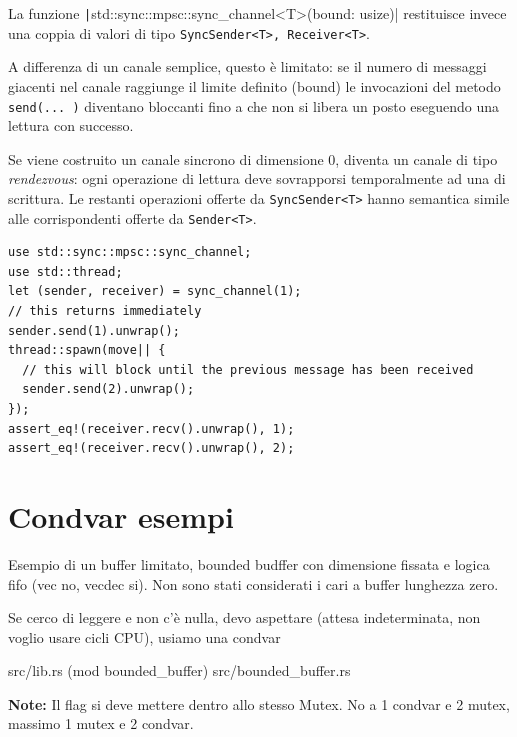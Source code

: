 La funzione \texttt|std::sync::mpsc::sync_channel<T>(bound: usize)|
restituisce invece una coppia di valori di tipo \verb|SyncSender<T>, Receiver<T>|.

A differenza di un canale semplice, questo è limitato: se il numero di messaggi
giacenti nel canale raggiunge il limite definito (bound) le invocazioni del
metodo \verb|send(... )| diventano bloccanti fino a che non si libera un posto
eseguendo una lettura con successo.

Se viene costruito un canale sincrono di dimensione 0, diventa un canale di tipo
\textit{rendezvous}: ogni operazione di lettura deve sovrapporsi temporalmente
ad una di scrittura. Le restanti operazioni offerte da \verb|SyncSender<T>|
hanno semantica simile alle corrispondenti offerte da \verb|Sender<T>|.


\begin{verbatim}
use std::sync::mpsc::sync_channel;
use std::thread;
let (sender, receiver) = sync_channel(1);
// this returns immediately
sender.send(1).unwrap();
thread::spawn(move|| {
  // this will block until the previous message has been received
  sender.send(2).unwrap();
});
assert_eq!(receiver.recv().unwrap(), 1);
assert_eq!(receiver.recv().unwrap(), 2);
\end{verbatim}

\section{Condvar esempi}
Esempio di un buffer limitato, bounded budffer con dimensione fissata e logica fifo (vec no, vecdec si).
Non sono stati considerati i cari a buffer lunghezza zero.

Se cerco di leggere e non c'è nulla, devo aspettare (attesa indeterminata, non voglio
usare cicli CPU), usiamo una condvar

src/lib.rs (mod bounded\_buffer)
src/bounded\_buffer.rs

\begin{tcolorbox}
  \textbf{Note:} Il flag si deve mettere dentro allo stesso Mutex. No a 1 condvar e 2 mutex, massimo 1 mutex e 2 condvar.
\end{tcolorbox}


